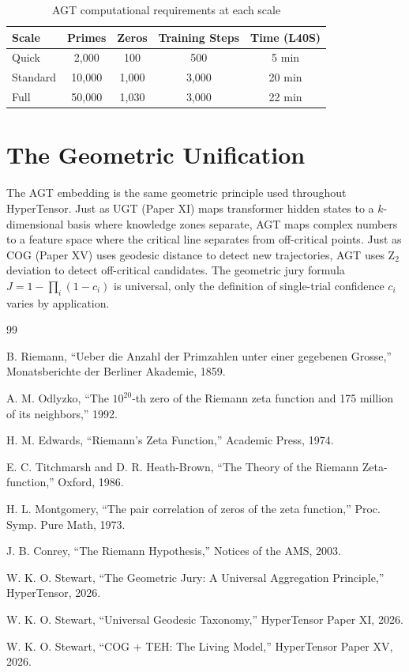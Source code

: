 \documentclass[11pt]{article}
\begin{document}
\begin{table}[h]
\centering
\begin{tabular}{lcccc}
\toprule
Scale & Primes & Zeros & Training Steps & Time (L40S) \\
\midrule
Quick & 2,000 & 100 & 500 & 5 min \\
Standard & 10,000 & 1,000 & 3,000 & 20 min \\
Full & 50,000 & 1,030 & 3,000 & 22 min \\
\bottomrule
\end{tabular}
\caption{AGT computational requirements at each scale}
\end{table}

\section{The Geometric Unification}

The AGT embedding is the same geometric principle used throughout HyperTensor. Just as UGT (Paper XI) maps transformer hidden states to a $k$-dimensional basis where knowledge zones separate, AGT maps complex numbers to a feature space where the critical line separates from off-critical points. Just as COG (Paper XV) uses geodesic distance to detect new trajectories, AGT uses Z$_2$ deviation to detect off-critical candidates. The geometric jury formula $J = 1 - \prod_i (1-c_i)$ is universal, only the definition of single-trial confidence $c_i$ varies by application.

\clearpage
\begin{thebibliography}{99}

 B. Riemann, ``Ueber die Anzahl der Primzahlen unter einer gegebenen Grosse,'' Monatsberichte der Berliner Akademie, 1859.

 A. M. Odlyzko, ``The $10^{20}$-th zero of the Riemann zeta function and 175 million of its neighbors,'' 1992.

 H. M. Edwards, ``Riemann's Zeta Function,'' Academic Press, 1974.

 E. C. Titchmarsh and D. R. Heath-Brown, ``The Theory of the Riemann Zeta-function,'' Oxford, 1986.

 H. L. Montgomery, ``The pair correlation of zeros of the zeta function,'' Proc. Symp. Pure Math, 1973.

 J. B. Conrey, ``The Riemann Hypothesis,'' Notices of the AMS, 2003.

 W. K. O. Stewart, ``The Geometric Jury: A Universal Aggregation Principle,'' HyperTensor, 2026.

 W. K. O. Stewart, ``Universal Geodesic Taxonomy,'' HyperTensor Paper XI, 2026.

 W. K. O. Stewart, ``COG + TEH: The Living Model,'' HyperTensor Paper XV, 2026.

\end{thebibliography}
\end{document}
